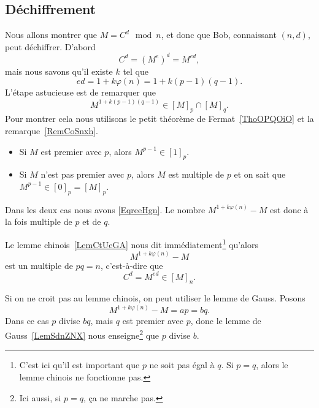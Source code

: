\subsection{Déchiffrement}

Nous allons montrer que \( M=C^d\mod n\), et donc que Bob, connaissant \( (n,d)\), peut déchiffrer. D'abord
\begin{equation}
    C^d=(M^e)^d=M^{ed},
\end{equation}
mais nous savons qu'il existe \( k\) tel que
\begin{equation}
    ed=1+k\varphi(n)=1+k(p-1)(q-1).
\end{equation}
L'étape astucieuse est de remarquer que
\begin{equation}    \label{EqreeHgn}
    M^{1+k(p-1)(q-1)}\in [M]_p\cap[M]_q.
\end{equation}
Pour montrer cela nous utilisons le petit théorème de Fermat~\ref{ThoOPQOiO} et la remarque~\ref{RemCoSnxh}.
\begin{itemize}
    \item Si \( M\) est premier avec \( p\), alors \( M^{p-1}\in[1]_p\).
    \item Si \( M\) n'est pas premier avec \( p\), alors \( M\) est multiple de \( p\) et on sait que \( M^{p-1}\in[0]_p=[M]_p\).
\end{itemize}
Dans les deux cas nous avons \eqref{EqreeHgn}. Le nombre \( M^{1+k\varphi(n)}-M\) est donc à la fois multiple de \( p\) et de \( q\).

Le lemme chinois~\ref{LemCtUeGA} nous dit immédiatement\footnote{C'est ici qu'il est important que \( p\) ne soit pas égal à \( q\). Si \( p=q\), alors le lemme chinois ne fonctionne pas.} qu'alors
\begin{equation}
    M^{1+k\varphi(n)}-M
\end{equation}
est un multiple de \( pq=n\), c'est-à-dire que
\begin{equation}
    C^d=M^{ed}\in [M]_n.
\end{equation}

Si on ne croit pas au lemme chinois, on peut utiliser le lemme de Gauss. Posons
\begin{equation}
    M^{1+k\varphi(n)}-M=ap=bq.
\end{equation}
Dans ce cas \( p\) divise \( bq\), mais \( q\) est premier avec \( p\), donc le lemme de Gauss~\ref{LemSdnZNX} nous enseigne\footnote{Ici aussi, si \( p=q\), ça ne marche pas.} que \( p\) divise \( b\).

